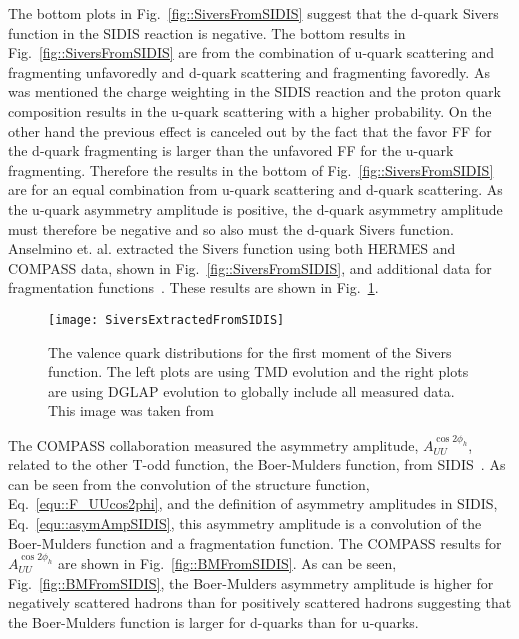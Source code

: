 The bottom plots in Fig.~\ref{fig::SiversFromSIDIS} suggest that the d-quark
Sivers function in the SIDIS reaction is negative.  The bottom results in
Fig.~\ref{fig::SiversFromSIDIS} are from the combination of u-quark scattering
and fragmenting unfavoredly and d-quark scattering and fragmenting favoredly.
As was mentioned the charge weighting in the SIDIS reaction and the proton quark
composition results in the u-quark scattering with a higher probability.  On the
other hand the previous effect is canceled out by the fact that the favor FF for
the d-quark fragmenting is larger than the unfavored FF for the u-quark
fragmenting.  Therefore the results in the bottom of
Fig.~\ref{fig::SiversFromSIDIS} are for an equal combination from u-quark
scattering and d-quark scattering.  As the u-quark asymmetry amplitude is
positive, the d-quark asymmetry amplitude must therefore be negative and so also
must the d-quark Sivers function.  Anselmino et. al. extracted the Sivers
function using both HERMES and COMPASS data, shown in
Fig.~\ref{fig::SiversFromSIDIS}, and additional data for fragmentation
functions~\cite{PhysRevD.86.014028}.  These results are shown in
Fig.~\ref{fig::SiversExtractedFromSIDIS}.

\begin{figure}[h!t]
  \centering \texttt{[image: SiversExtractedFromSIDIS]}
  \caption{The valence quark distributions for the first moment of the Sivers
    function.  The left plots are using TMD evolution and the right plots are
    using DGLAP evolution to globally include all measured data.  This image was
    taken from~\cite{PhysRevD.86.014028}}
  \label{fig::SiversExtractedFromSIDIS}
\end{figure}

The COMPASS collaboration measured the asymmetry amplitude, $A_{UU}^{\cos
  2\phi_h}$, related to the other T-odd function, the Boer-Mulders function,
from SIDIS~\cite{Adolph:2014pwc}.  As can be seen from the convolution of the
structure function, Eq.~\ref{equ::F_UUcos2phi}, and the definition of asymmetry
amplitudes in SIDIS, Eq.~\ref{equ::asymAmpSIDIS}, this asymmetry amplitude is a
convolution of the Boer-Mulders function and a fragmentation function.  The
COMPASS results for $A_{UU}^{\cos 2\phi_h}$ are shown in
Fig.~\ref{fig::BMFromSIDIS}.  As can be seen, Fig.~\ref{fig::BMFromSIDIS}, the
Boer-Mulders asymmetry amplitude is higher for negatively scattered hadrons than
for positively scattered hadrons suggesting that the Boer-Mulders function is
larger for d-quarks than for u-quarks.

